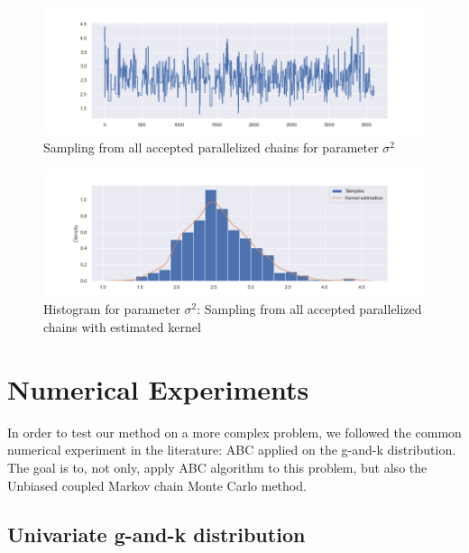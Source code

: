 \documentclass[11pt,a4paper,oneside]{report}
\begin{document}
\begin{figure}[h!]
	\centering
	\includegraphics[width=\textwidth]{doublecoupling_pack/doublecoupling_sampling_sigma}
	\caption{Sampling from all accepted parallelized chains for parameter $\sigma^2$ }   %
	\label{sigmaallsamdouble}
\end{figure}


\begin{figure}[h!]
	\centering
	\includegraphics[width=\textwidth]{doublecoupling_pack/doublecoupling_sigma_histogram_kernel}
	\caption{Histogram for parameter $\sigma^2$: Sampling from all accepted parallelized chains with estimated kernel }   %
	\label{sigmahistdouble}
\end{figure}














\chapter{Numerical Experiments}
In order to test our method on a more complex problem, we followed the common numerical experiment in the literature: ABC applied on the g-and-k distribution.
The goal is to, not only, apply ABC algorithm to this problem, but also the Unbiased coupled Markov chain Monte Carlo method.


\section{Univariate g-and-k distribution}
\end{document}
